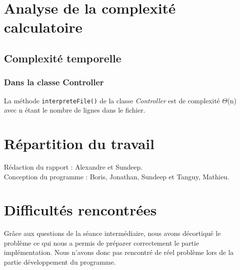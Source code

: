 \documentclass[11pt]{article}
\begin{document}
\section{Analyse de la complexité calculatoire}

\subsection{Complexité temporelle}
\subsubsection*{Dans la classe Controller}
La méthode \texttt{interpreteFile()} de la classe \textit{Controller} est de complexité $\Theta$(n) avec n étant le nombre de lignes dans le fichier.

\section{Répartition du travail}

Rédaction du rapport : Alexandre et Sundeep. \\
Conception du programme : Boris, Jonathan, Sundeep et Tanguy, Mathieu.

\section{Difficultés rencontrées}
Grâce aux questions de la séance intermédiaire, nous avons décortiqué le problème ce qui nous a permis de préparer correctement le partie implémentation. Nous n'avons donc pas rencontré de réel problème lors de la partie développement du programme.
\end{document}
